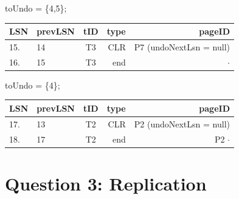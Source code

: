 \documentclass[paper=a4, fontsize=11pt]{scrartcl} %
\numberwithin{equation}{section} %
\numberwithin{figure}{section} %
\numberwithin{table}{section} %
\begin{document}
toUndo = \{4,5\};
\begin{center}
  \begin{tabular}{| l | l | c | r | r |}
    \hline
    \textbf{LSN} & \textbf{prevLSN} & \textbf{tID} & \textbf{type} & \textbf{pageID} \\ \hline
   15. & 14 & T3 & CLR & P7 (undoNextLsn = null) \\ \hline
   16. & 15 & T3 & end & $\cdot$ \\ \hline
  \end{tabular}
\end{center}

toUndo = \{4\};
\begin{center}
  \begin{tabular}{| l | l | c | r | r |}
    \hline
    \textbf{LSN} & \textbf{prevLSN} & \textbf{tID} & \textbf{type} & \textbf{pageID} \\ \hline
    17. & 13 & T2 & CLR & P2 (undoNextLsn = null)\\ \hline
    18. & 17 & T2 & end & P2 $\cdot$\\ \hline
  \end{tabular}
\end{center}

\clearpage
\section{Question 3: Replication}
\end{document}
